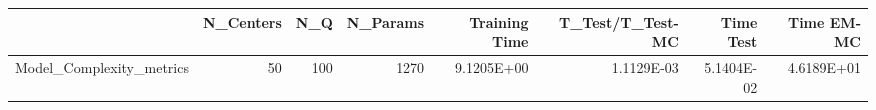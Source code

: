 \begin{tabular}{lrrrrrrr}
\toprule
{} &  N\_Centers &  N\_Q &  N\_Params &  Training Time &  T\_Test/T\_Test-MC &  Time Test &  Time EM-MC \\
\midrule
Model\_Complexity\_metrics &         50 &  100 &      1270 &     9.1205E+00 &        1.1129E-03 & 5.1404E-02 &  4.6189E+01 \\
\bottomrule
\end{tabular}
